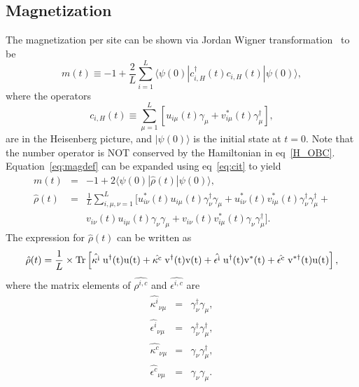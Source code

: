 \documentclass[a4paper,10pt]{article}
\begin{document}
\subsection{Magnetization}
\label{subsec:magcalc}
The magnetization per site can be shown via Jordan Wigner transformation~\cite{arnab1} to be
\begin{equation}
\label{eq:magdef}
m(t)\equiv -1 + \frac{2}{L}\sum^L_{i=1} \langle \psi(0) | c^\dagger_{i,H} (t) c_{i,H}(t) |\psi(0)\rangle,
\end{equation}
where the operators 
\begin{equation}
\label{eq:cit}
c_{i,H}(t)\equiv \sum^L_{\mu=1} \left[u_{i\mu}(t)\gamma_\mu+v^\ast_{i\mu}(t)\gamma^\dagger_\mu\right],
\end{equation}
are in the Heisenberg picture, and $|\psi(0)\rangle$ is the initial state at $t=0$. Note that the number operator is NOT conserved by the Hamiltonian in eq~\ref{H_OBC}. Equation~\ref{eq:magdef} can be expanded using eq~\ref{eq:cit} to yield
\begin{eqnarray}
\label{eq:magops}
 m(t) &=& -1+2\langle\psi(0)|\hat{\rho}(t)|\psi(0)\rangle,\nonumber \\
 \hat{\rho}(t) &=& \frac{1}{L}\sum^L_{i,\mu,\nu = 1}\bigg[u^\ast_{i\nu}(t) u_{i\mu}(t)\gamma^\dagger_\nu\gamma_\mu + u^\ast_{i\nu}(t)v^\ast_{i\mu}(t)\gamma^\dagger_\nu\gamma^\dagger_\mu + \nonumber \\
  & & v_{i\nu}(t)u_{i\mu}(t)\gamma_\nu\gamma_\mu + v_{i\nu}(t)v^\ast_{i\mu}(t)\gamma_\nu\gamma^\dagger_\mu\bigg] .
\end{eqnarray}
The expression for $\hat{\rho}(t)$ can be written as
\begin{equation}
 \label{m:t}
 \hat{\rho}(t) = \frac{1}{L} \times \rm{Tr}\left[\hat{\kappa^i} \; u^\dagger(t)u(t) + \hat{\kappa^c} \; v^\dagger(t)v(t) + \hat{\epsilon^i} \; u^\dagger(t)v^\ast(t)+\hat{\epsilon^c} \; v^{\ast \dagger}(t)u(t)\right],
\end{equation}
where the matrix elements of $\hat{\rho^{i,c}}$ and $\hat{\epsilon^{i,c}}$ are
\begin{eqnarray}
\label{matelems}
\hat{\kappa^i}_{\nu\mu} &=& \gamma^\dagger_\nu\gamma_\mu, \nonumber \\
\hat{\epsilon^i}_{\nu\mu} &=& \gamma^\dagger_\nu\gamma^\dagger_\mu,\nonumber \\
\hat{\kappa^c}_{\nu\mu} &=& \gamma_\nu\gamma^\dagger_\mu, \nonumber \\
\hat{\epsilon^c}_{\nu\mu} &=& \gamma_\nu\gamma_\mu.
\end{eqnarray}
\end{document}
